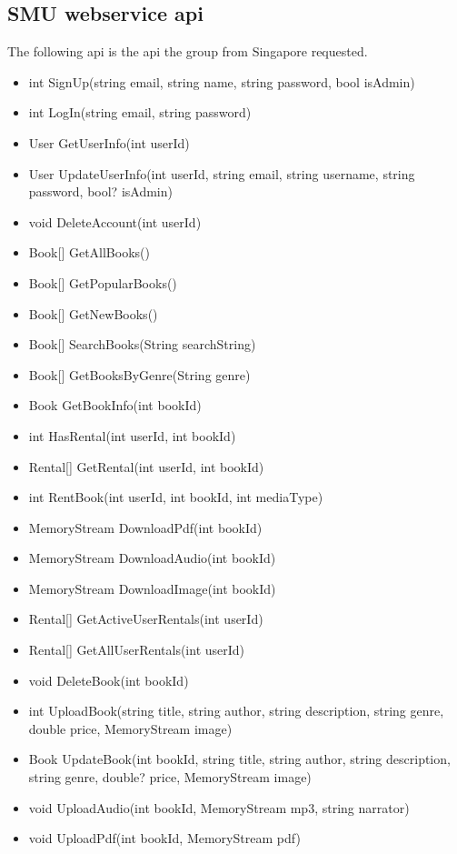 \documentclass[a4paper,11pt,report]{article}
\begin{document}
\subsection{SMU webservice api}

The following api is the api the group from Singapore requested. 

\begin{itemize}
	\item int SignUp(string email, string name, string password, bool isAdmin)
	\item int LogIn(string email, string password)
	\item User GetUserInfo(int userId)
	\item User UpdateUserInfo(int userId, string email, string username, string password, bool? isAdmin)
	\item void DeleteAccount(int userId)
	\item Book[] GetAllBooks()
	\item Book[] GetPopularBooks()
	\item Book[] GetNewBooks()
	\item Book[] SearchBooks(String searchString)
	\item Book[] GetBooksByGenre(String genre)
	\item Book GetBookInfo(int bookId)
	\item int HasRental(int userId, int bookId)
	\item Rental[] GetRental(int userId, int bookId)
	\item int RentBook(int userId, int bookId, int mediaType)
	\item MemoryStream DownloadPdf(int bookId)
	\item MemoryStream DownloadAudio(int bookId)
	\item MemoryStream DownloadImage(int bookId)
	\item Rental[] GetActiveUserRentals(int userId)
	\item Rental[] GetAllUserRentals(int userId)
	\item void DeleteBook(int bookId)
	\item int UploadBook(string title, string author, string description, string genre, double price, MemoryStream image)
	\item Book UpdateBook(int bookId, string title, string author, string description, string genre, double? price, MemoryStream image)
	\item void UploadAudio(int bookId, MemoryStream mp3, string narrator)
	\item void UploadPdf(int bookId, MemoryStream pdf)
\end{itemize}
\end{document}
